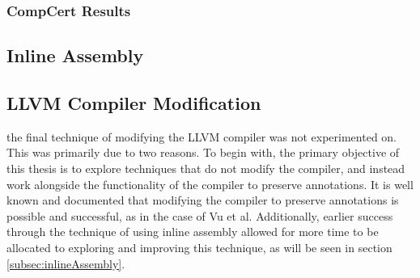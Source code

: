 \subsubsection{CompCert Results}

\subsection{Inline Assembly}

\subsection{LLVM Compiler Modification}
the final technique of modifying the LLVM compiler was not experimented on. This was primarily due to two reasons. To begin with, the primary objective of this thesis is to explore techniques that do not modify the compiler, and instead work alongside the functionality of the compiler to preserve annotations. It is well known and documented that modifying the compiler to preserve annotations is possible and successful, as in the case of Vu et al. \cite{vu2020secure} Additionally, earlier success through the technique of using inline assembly allowed for more time to be allocated to exploring and improving this technique, as will be seen in section \ref{subsec:inlineAssembly}.

\label{subsec:inlineAssembly}

